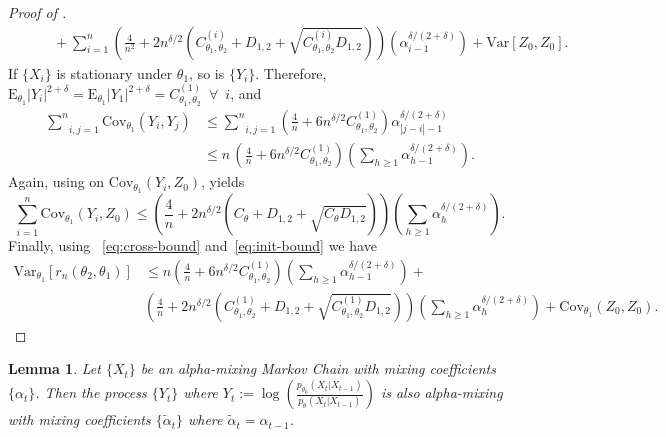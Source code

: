 \documentclass[11pt]{amsart}
\newcommand{\E}{\mathrm{E}}
\newcommand{\Var}{\mathrm{Var}}
\newcommand{\Cov}{\mathrm{Cov}}
\newtheorem{lemma}{Lemma}[section]
\begin{document}
\begin{proof}[Proof of ]
\begin{align*}
     &\qquad+ \sum_{i=1}^n\left(\frac{4}{n^2}+2n^{\delta/2}(C_{\theta_1,\theta_2}^{(i)}+D_{1,2}+\sqrt{C_{\theta_1,\theta_2}^{(i)}D_{1,2}})\right)\left(\alpha_{i-1}^{\delta/(2+\delta)}\right) + \Var[Z_0,Z_0].
\end{align*}
If $\{X_i\}$ is stationary under $\theta_1$, so is $\{Y_i\}$. Therefore, $\E_{\theta_1} |Y_i|^{2+\delta}= \E_{\theta_1} |Y_1|^{2+\delta}=C_{\theta_1,\theta_2}^{(1)}\enspace\forall\enspace i$, and
\begin{align}
\nonumber
    \underset{i,j=1}{\sum^n} \Cov_{\theta_1} (Y_i,Y_j) & \leq\underset{i,j=1}{\sum^n} \left(\frac{4}{n}+6n^{\delta/2}C_{\theta_1,\theta_2}^{(1)}\right)\alpha_{|j-i|-1}^{\delta/(2+\delta)}\\
    \label{eq:cross-bound}
     & \leq n\,\left(\frac{4}{n}+6n^{\delta/2}C_{\theta_1,\theta_2}^{(1)} \right)\left(\underset{h\geq 1}{\sum} \alpha_{h-1}^{\delta/(2+\delta)}\right).
\end{align}
%
Again, using  on $\Cov_{\theta_1}(Y_i,Z_0)$, yields
%
\begin{equation}
\label{eq:init-bound}
\underset{i=1}{\sum^n} \Cov_{\theta_1}(Y_i,Z_0) \leq \left(\frac{4}{n}+2n^{\delta/2}(C_{\theta}+D_{1,2}+\sqrt{C_{\theta}D_{1,2}})\right)\left(\sum_{h\geq 1} \alpha_{h}^{\delta/(2+\delta)}\right).
\end{equation}
%
Finally, using ~\cref{eq:cross-bound} and~\cref{eq:init-bound} we have
%
\begin{align*}
    \Var_{\theta_1} \left[ r_n(\theta_2,\theta_1) \right] & \leq n \left(\frac{4}{n}+6n^{\delta/2}C_{\theta_1,\theta_2}^{(1)}\right) \left(\sum_{h\geq 1}\alpha_{h-1}^{\delta/(2+\delta)}\right) + \\
    &\left(\frac{4}{n}+2n^{\delta/2}(C_{\theta_1,\theta_2}^{(1)}+D_{1,2}+\sqrt{C_{\theta_1,\theta_2}^{(1)}D_{1,2}}) \right) \left(\sum_{h\geq 1} \alpha_{h}^{\delta/(2+\delta)}\right) + \Cov_{\theta_1} (Z_0,Z_0).
\end{align*}
\end{proof}
\begin{lemma}\label{lem:paired-meas}
{Let $\{X_t\}$ be an alpha-mixing Markov Chain with mixing coefficients $\{\alpha_t\}$. Then the process $\{Y_t\}$ where $Y_t := \log \left( \frac{ p_{\theta_0}(X_t|X_{t-1}) } { p_{\theta}(X_t|X_{t-1}) } \right)$} is also alpha-mixing with mixing coefficients $\{\tilde \alpha_t\} $ where $\tilde \alpha_t = \alpha_{t-1}$.
\end{lemma}
\end{document}
